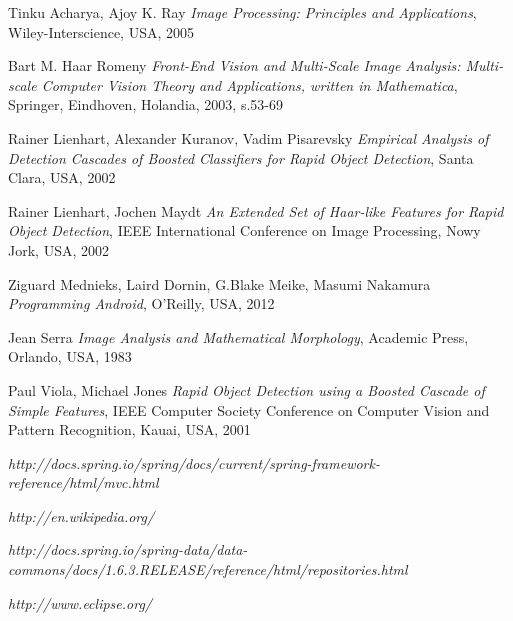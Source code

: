 \begin{thebibliography}{99}
   	Tinku Acharya, Ajoy K. Ray
   	\emph{Image Processing: Principles and Applications},
	Wiley-Interscience, USA, 2005
	
   
	Bart M. Haar Romeny
	\emph{Front-End Vision and Multi-Scale Image Analysis: Multi-scale Computer Vision Theory and Applications, written in Mathematica},
	Springer,
	Eindhoven, Holandia, 2003,
	s.53-69

	Rainer Lienhart, Alexander Kuranov, Vadim Pisarevsky
	\emph{Empirical Analysis of Detection Cascades of Boosted Classifiers for Rapid Object 
Detection},
	Santa Clara, USA, 2002	
		
	Rainer Lienhart, Jochen Maydt
	\emph{An Extended Set of Haar-like Features for Rapid Object Detection},
	IEEE International Conference on Image Processing, Nowy Jork, USA, 2002
	
	Ziguard Mednieks, Laird Dornin, G.Blake Meike, Masumi Nakamura 
   	\emph{Programming Android}, O'Reilly,
    USA, 2012

	Jean Serra
	\emph{Image Analysis and Mathematical Morphology},
	Academic Press, Orlando, USA, 1983
	
	Paul Viola, Michael Jones
	\emph{Rapid Object Detection using a Boosted Cascade of Simple Features},
	IEEE Computer Society Conference on Computer Vision and Pattern Recognition, Kauai, USA, 2001

	\emph{http://docs.spring.io/spring/docs/current/spring-framework-reference/html/mvc.html}
	
	
	\emph{http://en.wikipedia.org/}	
	
	\emph{http://docs.spring.io/spring-data/data-commons/docs/1.6.3.RELEASE/reference/html/repositories.html}
	
	\emph{http://www.eclipse.org/}	



\end{thebibliography}
